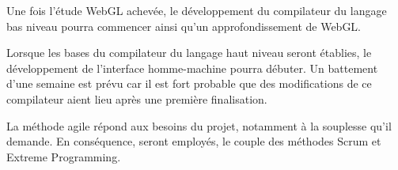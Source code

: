 Une fois l’étude WebGL achevée, le développement du compilateur du langage bas niveau pourra commencer ainsi qu’un approfondissement de WebGL.


Lorsque les bases du compilateur du langage haut niveau seront établies, le développement de l’interface homme-machine pourra débuter.
 Un battement d’une semaine est prévu car il est fort probable que des modifications de ce compilateur aient lieu après une première finalisation.

La méthode agile répond aux besoins du projet, notamment à la souplesse qu’il demande. 
En conséquence, seront employés, le couple des méthodes Scrum et Extreme Programming. 